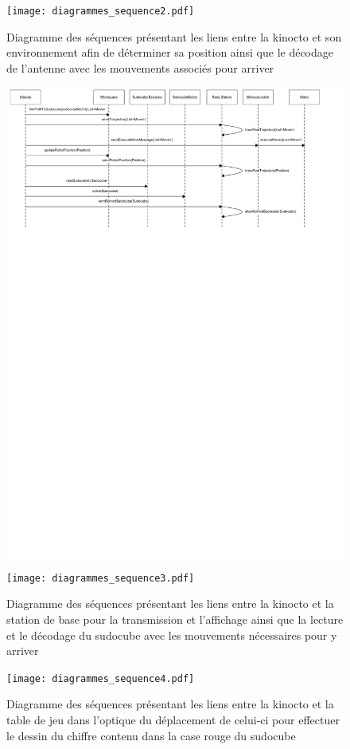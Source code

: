 \begin{landscape}
\begin{figure}[htb]
\texttt{[image: diagrammes\_sequence2.pdf]}
\caption{Diagramme des séquences présentant les liens entre la kinocto et son environnement afin de déterminer sa position ainsi que le décodage de l'antenne avec les mouvements associés pour arriver}
\label{diagSeq2Ite1}
\end{figure}

\begin{figure}[htb]
\includegraphics[scale=0.9]{fig/diagrammes_sequence3.pdf}
\texttt{[image: diagrammes\_sequence3.pdf]}
\caption{Diagramme des séquences présentant les liens entre la kinocto et la station de base pour la transmission et l'affichage ainsi que la lecture et le décodage du sudocube avec les mouvements nécessaires pour y arriver}
\label{diagSeq3Ite1}
\end{figure}

\begin{figure}[htb]
	\texttt{[image: diagrammes\_sequence4.pdf]}
\caption{Diagramme des séquences présentant les liens entre la kinocto et la table de jeu dans l'optique du déplacement de celui-ci pour effectuer le dessin du chiffre contenu dans la case rouge du sudocube}
\label{diagSeq4Ite1}
\end{figure}

\end{landscape}
